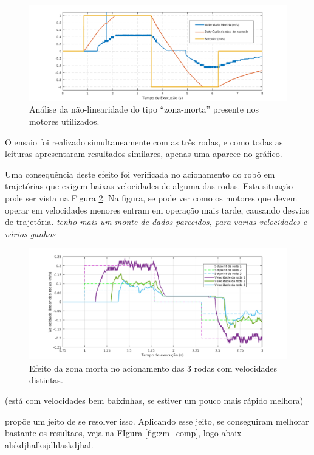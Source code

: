 \begin{figure}[h]
  \centering
  \includegraphics[width = \textwidth]{imagens/zonamorta}
  \caption{Análise da não-linearidade do tipo ``zona-morta'' presente nos motores utilizados.}
  \label{fig:zonamorta}
\end{figure}

O ensaio foi realizado simultaneamente com as três rodas, e como todas as leituras apresentaram resultados similares, apenas uma aparece no gráfico.

Uma consequência deste efeito foi verificada no acionamento do robô em trajetórias que exigem baixas velocidades de alguma das rodas. Esta situação pode ser vista na Figura \ref{fig:zm3rodas}. Na figura, se pode ver como os motores que devem operar em velocidades menores entram em operação mais tarde, causando desvios de trajetória. \textit{tenho mais um monte de dados parecidos, para varias velocidades e vários ganhos}

\begin{figure}[h]
  \centering
  \includegraphics[width = \textwidth]{imagens/zm3rodas}
  \caption{Efeito da zona morta no acionamento das 3 rodas com velocidades distintas.}
  \label{fig:zm3rodas}
\end{figure}

(está com velocidades bem baixinhas, se estiver um pouco mais rápido melhora)

\cite{cunha2001zm} propõe um jeito de se resolver isso. Aplicando esse jeito, se conseguiram melhorar bastante os resultaos, veja na FIgura \ref{fig:zm_comp}, logo abaix alskdjhalksjdhlaskdjhal.

